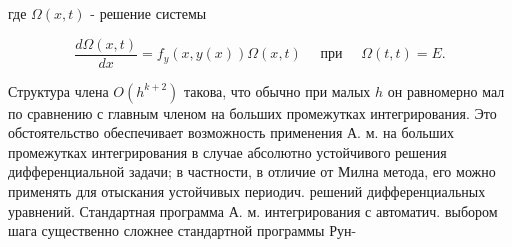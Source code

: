 \documentclass[10pt]{article}
\begin{document}
где $\Omega(x, t)$ - решение системы



\[

\frac{d \Omega(x, t)}{d x}=f_{y}(x, y(x)) \Omega(x, t) \quad \text { при } \quad \Omega(t, t)=E .

\]



Структура члена $O\left(h^{k+2}\right)$ такова, что обычно при малых $h$ он равномерно мал по сравнению с главным членом на больших промежутках интегрирования. Это обстоятельство обеспечивает возможность применения А. м. на больших промежутках интегрирования в случае абсолютно устойчивого решения дифференциальной задачи; в частности, в отличие от Милна метода, его можно применять для отыскания устойчивых периодич. решений дифференциальных уравнений. Стандартная программа А. м. интегрирования с автоматич. выбором шага существенно сложнее стандартной программы Рун-
\end{document}
